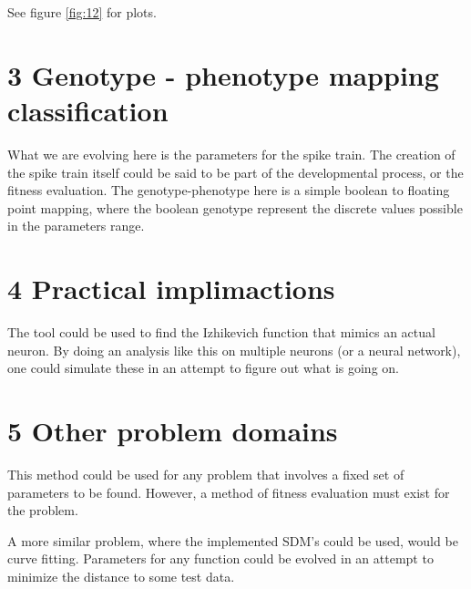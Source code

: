 \documentclass[11pt]{article}
\begin{document}
See figure \ref{fig:12} for plots.

\section*{3 Genotype - phenotype mapping classification}

What we are evolving here is the parameters for the spike train. The creation of the spike train itself
could be said to be part of the developmental process, or the fitness evaluation. The genotype-phenotype
here is a simple boolean to floating point mapping, where the boolean genotype represent the discrete values possible
in the parameters range.

\section*{4 Practical implimactions}

The tool could be used to find the Izhikevich function that mimics an actual neuron. By doing an analysis
like this on multiple neurons (or a neural network), one could simulate these in an attempt to figure out
what is going on.

\section*{5 Other problem domains}

This method could be used for any problem that involves a fixed set of parameters to be found. However,
a method of fitness evaluation must exist for the problem.

A more similar problem, where the implemented SDM's could be used, would be curve fitting.
Parameters for any function could be evolved in an attempt to minimize the distance to some test data.
\end{document}
